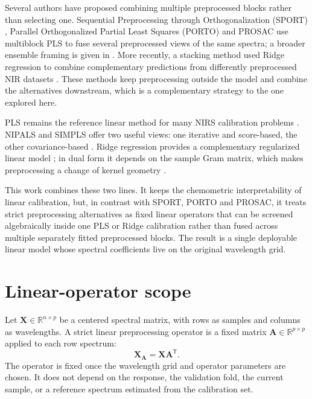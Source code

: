 \documentclass[11pt,a4paper]{article}
\newcommand{\X}{\mathbf{X}}
\newcommand{\A}{\mathbf{A}}
\newcommand{\R}{\mathbb{R}}
\newcommand{\transpose}{^{\mathsf T}}
\begin{document}
Several authors have proposed combining multiple preprocessed blocks rather
than selecting one.  Sequential Preprocessing through Orthogonalization
(SPORT) \citep{roger2020sport}, Parallel Orthogonalized Partial Least Squares
(PORTO) \citep{mishra2021porto} and PROSAC \citep{mishra2022prosac} use
multiblock PLS to fuse several preprocessed views of the same spectra; a
broader ensemble framing is given in
\citet{mishra2020ensemble}.  More recently, a stacking method used Ridge
regression to combine complementary predictions from differently
preprocessed NIR datasets \citep{huang2024stacking}.  These methods keep
preprocessing outside the model and combine the alternatives downstream,
which is a complementary strategy to the one explored here.

PLS remains the reference linear method for many NIRS calibration problems
\citep{geladi1986partial,wold2001pls}.  NIPALS and SIMPLS offer two useful
views: one iterative and score-based, the other covariance-based
\citep{dejong1993simpls}.  Ridge regression provides a complementary
regularized linear model \citep{hoerl1970ridge}; in dual form it depends on
the sample Gram matrix, which makes preprocessing a change of kernel geometry
\citep{scholkopf2002learning,hastie2009elements}.

This work combines these two lines.  It keeps the chemometric interpretability
of linear calibration, but, in contrast with SPORT, PORTO and PROSAC, it
treats strict preprocessing alternatives as fixed linear operators that can
be screened algebraically inside one PLS or Ridge calibration rather than
fused across multiple separately fitted preprocessed blocks.  The result is a
single deployable linear model whose spectral coefficients live on the
original wavelength grid.

\section{Linear-operator scope}

Let $\X\in\R^{n\times p}$ be a centered spectral matrix, with rows as samples
and columns as wavelengths.  A strict linear preprocessing operator is a fixed
matrix $\A\in\R^{p\times p}$ applied to each row spectrum:
\begin{equation}
  \X_{\A}=\X\A\transpose .
\end{equation}
The operator is fixed once the wavelength grid and operator parameters are
chosen.  It does not depend on the response, the validation fold, the current
sample, or a reference spectrum estimated from the calibration set.
\end{document}

